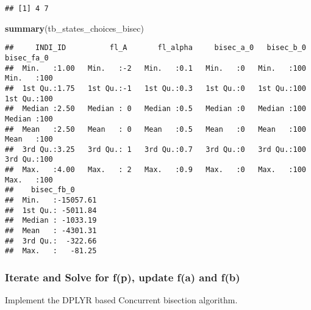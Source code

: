 \documentclass[
]{book}
\newenvironment{Shaded}{\begin{snugshade}}{\end{snugshade}}
\newcommand{\KeywordTok}[1]{\textcolor[rgb]{0.13,0.29,0.53}{\textbf{#1}}}
\newcommand{\NormalTok}[1]{#1}
\begin{document}
\begin{verbatim}
## [1] 4 7
\end{verbatim}

\begin{Shaded}
\begin{Highlighting}[]
\KeywordTok{summary}\NormalTok{(tb_states_choices_bisec)}
\end{Highlighting}
\end{Shaded}

\begin{verbatim}
##     INDI_ID          fl_A       fl_alpha     bisec_a_0   bisec_b_0     bisec_fa_0 
##  Min.   :1.00   Min.   :-2   Min.   :0.1   Min.   :0   Min.   :100   Min.   :100  
##  1st Qu.:1.75   1st Qu.:-1   1st Qu.:0.3   1st Qu.:0   1st Qu.:100   1st Qu.:100  
##  Median :2.50   Median : 0   Median :0.5   Median :0   Median :100   Median :100  
##  Mean   :2.50   Mean   : 0   Mean   :0.5   Mean   :0   Mean   :100   Mean   :100  
##  3rd Qu.:3.25   3rd Qu.: 1   3rd Qu.:0.7   3rd Qu.:0   3rd Qu.:100   3rd Qu.:100  
##  Max.   :4.00   Max.   : 2   Max.   :0.9   Max.   :0   Max.   :100   Max.   :100  
##    bisec_fb_0       
##  Min.   :-15057.61  
##  1st Qu.: -5011.84  
##  Median : -1033.19  
##  Mean   : -4301.31  
##  3rd Qu.:  -322.66  
##  Max.   :   -81.25
\end{verbatim}

\hypertarget{iterate-and-solve-for-fp-update-fa-and-fb}{%
\subsubsection{Iterate and Solve for f(p), update f(a) and f(b)}\label{iterate-and-solve-for-fp-update-fa-and-fb}}

Implement the DPLYR based Concurrent bisection algorithm.
\end{document}
